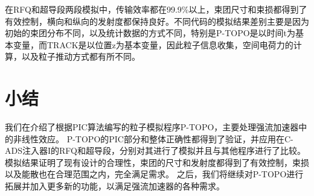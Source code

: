 在RFQ和超导段两段模拟中，传输效率都在99.9\%以上，束团尺寸和束损都得到了有效控制，横向和纵向的发射度都保持良好。不同代码的模拟结果差别主要是因为初始的束团分布不同，以及统计数据的方式不同，特别是P-TOPO是以时间t为基本变量，而TRACK是以位置z为基本变量，因此粒子信息收集，空间电荷力的计算，以及粒子推动方式都有所不同。

\section{小结}
我们在介绍了根据PIC算法编写的粒子模拟程序P-TOPO，主要处理强流加速器中的非线性效应。
P-TOPO的PIC部分和整体正确性都得到了验证，并应用在C-ADS注入器I的RFQ和超导段，分别对其进行了模拟并且与其他程序进行了比较。
模拟结果证明了现有设计的合理性，束团的尺寸和发射度都得到了有效控制，束损以及能散也在合理范围之内，完全满足需求。
之后，我们将继续对P-TOPO进行拓展并加入更多新的功能，以满足强流加速器的各种需求。